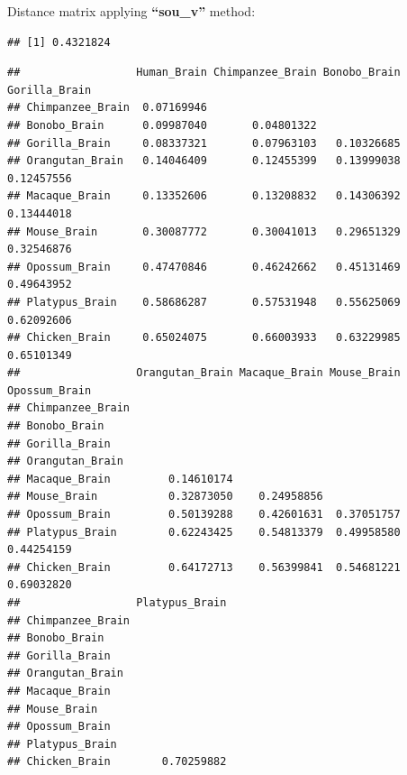 \documentclass[]{book}
\newenvironment{Shaded}{\begin{snugshade}}{\end{snugshade}}
\newcommand{\DataTypeTok}[1]{\textcolor[rgb]{0.13,0.29,0.53}{#1}}
\newcommand{\KeywordTok}[1]{\textcolor[rgb]{0.13,0.29,0.53}{\textbf{#1}}}
\newcommand{\NormalTok}[1]{#1}
\newcommand{\OperatorTok}[1]{\textcolor[rgb]{0.81,0.36,0.00}{\textbf{#1}}}
\newcommand{\StringTok}[1]{\textcolor[rgb]{0.31,0.60,0.02}{#1}}
\begin{document}
Distance matrix applying \textbf{``sou\_v''} method:

\begin{Shaded}
\end{Shaded}

\begin{verbatim}
## [1] 0.4321824
\end{verbatim}

\begin{Shaded}
\end{Shaded}

\begin{verbatim}
##                  Human_Brain Chimpanzee_Brain Bonobo_Brain Gorilla_Brain
## Chimpanzee_Brain  0.07169946                                            
## Bonobo_Brain      0.09987040       0.04801322                           
## Gorilla_Brain     0.08337321       0.07963103   0.10326685              
## Orangutan_Brain   0.14046409       0.12455399   0.13999038    0.12457556
## Macaque_Brain     0.13352606       0.13208832   0.14306392    0.13444018
## Mouse_Brain       0.30087772       0.30041013   0.29651329    0.32546876
## Opossum_Brain     0.47470846       0.46242662   0.45131469    0.49643952
## Platypus_Brain    0.58686287       0.57531948   0.55625069    0.62092606
## Chicken_Brain     0.65024075       0.66003933   0.63229985    0.65101349
##                  Orangutan_Brain Macaque_Brain Mouse_Brain Opossum_Brain
## Chimpanzee_Brain                                                        
## Bonobo_Brain                                                            
## Gorilla_Brain                                                           
## Orangutan_Brain                                                         
## Macaque_Brain         0.14610174                                        
## Mouse_Brain           0.32873050    0.24958856                          
## Opossum_Brain         0.50139288    0.42601631  0.37051757              
## Platypus_Brain        0.62243425    0.54813379  0.49958580    0.44254159
## Chicken_Brain         0.64172713    0.56399841  0.54681221    0.69032820
##                  Platypus_Brain
## Chimpanzee_Brain               
## Bonobo_Brain                   
## Gorilla_Brain                  
## Orangutan_Brain                
## Macaque_Brain                  
## Mouse_Brain                    
## Opossum_Brain                  
## Platypus_Brain                 
## Chicken_Brain        0.70259882
\end{verbatim}
\end{document}
